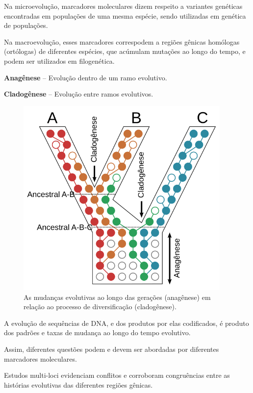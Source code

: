 \documentclass[
]{book}
\begin{document}
Na microevolução, marcadores moleculares dizem respeito a variantes genéticas encontradas em populações de uma mesma espécie, sendo utilizadas em genética de populações.

Na macroevolução, esses marcadores correspodem a regiões gênicas homólogas (ortólogas) de diferentes espécies, que acúmulam mutações ao longo do tempo, e podem ser utilizados em filogenética.

\textbf{Anagênese} -- Evolução dentro de um ramo evolutivo.

\textbf{Cladogênese} -- Evolução entre ramos evolutivos.

\begin{figure}

{\centering \includegraphics[width=400px]{figs/genealogy_concepts} 

}

\caption{As mudanças evolutivas ao longo das gerações (anagênese) em relação ao processo de diversificação (cladogênese).}\label{fig:genearvore}
\end{figure}

A evolução de sequências de DNA, e dos produtos por elas codificados, é produto dos padrões e taxas de mudança ao longo do tempo evolutivo.

Assim, diferentes questões podem e devem ser abordadas por diferentes marcadores moleculares.

Estudos multi-loci evidenciam conflitos e corroboram congruências entre as histórias evolutivas das diferentes regiões gênicas.
\end{document}
